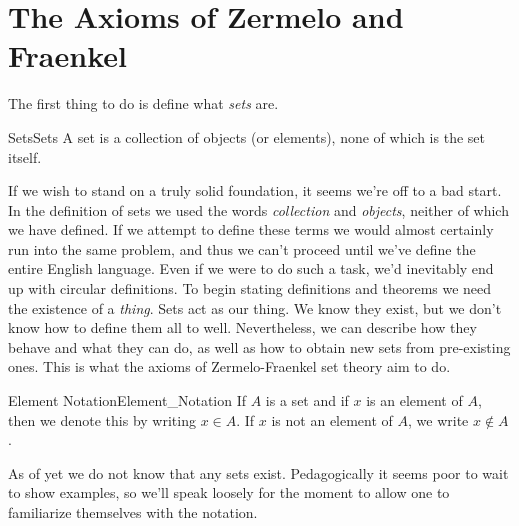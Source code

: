 \section{The Axioms of Zermelo and Fraenkel}
    The first thing to do is define what \textit{sets} are.
    \begin{fdefinition}{Sets}{Sets}
        A \gls{set} is a collection of objects (or elements), none of which is
        the set itself.
    \end{fdefinition}
    If we wish to stand on a truly solid foundation, it seems we're off to a bad
    start. In the definition of sets we used the words \textit{collection} and
    \textit{objects}, neither of which we have defined. If we attempt to define
    these terms we would almost certainly run into the same problem, and thus we
    can't proceed until we've define the entire English language. Even if we
    were to do such a task, we'd inevitably end up with circular definitions. To
    begin stating definitions and theorems we need the existence of a
    \textit{thing}. Sets act as our thing. We know they exist, but we don't know
    how to define them all to well. Nevertheless, we can describe how they
    behave and what they can do, as well as how to obtain new sets from
    pre-existing ones. This is what the axioms of Zermelo-Fraenkel set theory
    aim to do.
    \begin{fnotation}{Element Notation}{Element_Notation}
        If $A$ is a \gls{set} and if $x$ is an element of
        $A$, then we denote this by writing $x\in{A}$. If $x$ is not an element
        of $A$, we write $x\notin{A}$.
    \end{fnotation}
    As of yet we do not know that any sets exist. Pedagogically it seems poor to
    wait to show examples, so we'll speak loosely for the moment to allow one to
    familiarize themselves with the notation.
